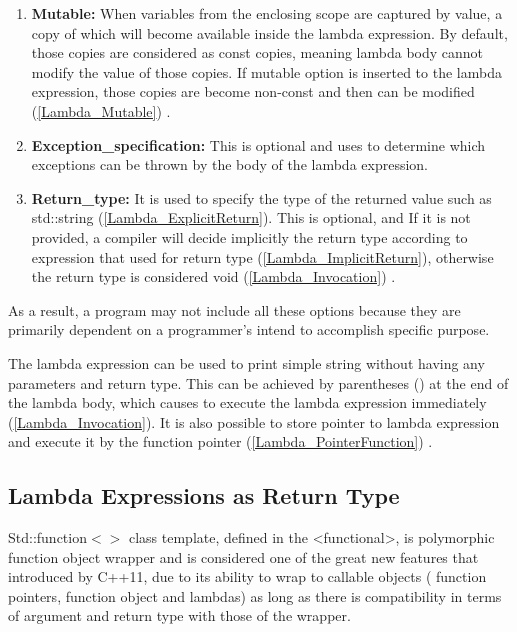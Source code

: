 \documentclass[11pt]{report}
\begin{document}
\begin{enumerate}
\item \textbf{Mutable:} When variables from the enclosing scope are captured by value, a copy of which will become available inside the lambda expression. By default, those copies are considered as const copies, meaning lambda body cannot modify the value of those copies. If mutable option is inserted to the lambda expression, those copies are become non-const and then can be modified (\ref{Lambda_Mutable}) \cite{Cppreference:2012:Cpp11}.

\item \textbf{Exception\_specification:} This is optional and uses to determine which exceptions can be thrown by the body of the lambda expression.

\item \textbf{Return\_type:} It is used to specify the type of the returned value such as std::string (\ref{Lambda_ExplicitReturn}). This is optional, and If it is not provided, a compiler will decide implicitly the return type according to expression that used for return type (\ref{Lambda_ImplicitReturn}), otherwise the return type is considered void (\ref{Lambda_Invocation}) \cite{Cppreference:2012:Cpp11}.
\end{enumerate}

As a result, a program may not include all these options because they are primarily dependent on a programmer's intend to accomplish specific purpose.


The lambda expression can be used to print simple string without having any parameters and return type. This can be achieved by parentheses () at the end of the lambda body, which causes to execute the lambda expression immediately (\ref{Lambda_Invocation}). It is also possible to store pointer to lambda expression and execute it by the function pointer (\ref{Lambda_PointerFunction}) \cite{Gregorie:professionalcpp}.


\subsection{Lambda Expressions as Return Type}
\label{subsection: Lambda Expressions as Return Type}
Std::function$<>$ class template, defined in the <functional>, is polymorphic function object wrapper and is considered one of the great new features that introduced by C++11, due to its ability to wrap to callable objects ( function pointers, function object and lambdas) as long as there is compatibility in terms of argument  and return type with those of the wrapper.
\end{document}
